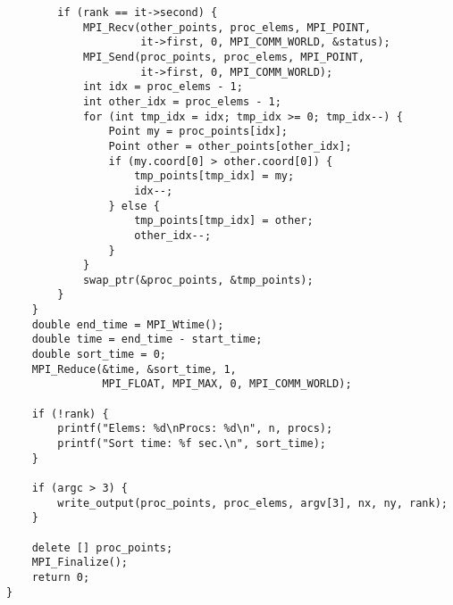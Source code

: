 \documentclass[oneside,final,14pt]{extreport}
\begin{document}
\begin{verbatim}
        if (rank == it->second) {
            MPI_Recv(other_points, proc_elems, MPI_POINT,
                     it->first, 0, MPI_COMM_WORLD, &status);
            MPI_Send(proc_points, proc_elems, MPI_POINT,
                     it->first, 0, MPI_COMM_WORLD);
            int idx = proc_elems - 1;
            int other_idx = proc_elems - 1;
            for (int tmp_idx = idx; tmp_idx >= 0; tmp_idx--) {
                Point my = proc_points[idx];
                Point other = other_points[other_idx];
                if (my.coord[0] > other.coord[0]) {
                    tmp_points[tmp_idx] = my;
                    idx--;
                } else {
                    tmp_points[tmp_idx] = other;
                    other_idx--;
                }
            }
            swap_ptr(&proc_points, &tmp_points);
        }
    }
    double end_time = MPI_Wtime();
    double time = end_time - start_time;
    double sort_time = 0;
    MPI_Reduce(&time, &sort_time, 1,
               MPI_FLOAT, MPI_MAX, 0, MPI_COMM_WORLD);

    if (!rank) {
        printf("Elems: %d\nProcs: %d\n", n, procs);
        printf("Sort time: %f sec.\n", sort_time);
    }

    if (argc > 3) {
        write_output(proc_points, proc_elems, argv[3], nx, ny, rank);
    }

    delete [] proc_points;
    MPI_Finalize();
    return 0;
}

\end{verbatim}
\end{document}
